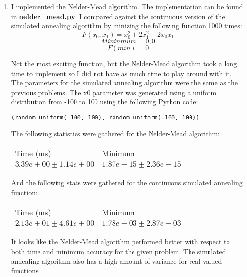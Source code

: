 \documentclass[11pt]{article}
\begin{document}
\begin{enumerate}
\begin{enumerate}
	{\bf Analysis}: The 10-node graph coloring problem was solved correctly every time given a random input list. The average runtime of 271 milliseconds seemed reasonable.

\end{enumerate}	
\item I implemented the Nelder-Mead algorithm. The implementation can be found in { \bf nelder\_mead.py}. I compared against the continuous version of the simulated annealing algorithm by minizing the following function 1000 times:
$$ F(x_0, x_1) =  x_0^2 + 2x_1^2 + 2x_0x_1 $$
$$ Mininmum = 0, 0 $$
$$ F(min) = 0 $$

Not the most exciting function, but the Nelder-Mead algorithm took a long time to implement so I did not have as much time to play around with it. The parameters for the simulated annealing algorithm were the same as the previous problems. The x0 parameter was generated using a uniform distribution from -100 to 100 using the following Python code:
\begin{lstlisting}
(random.uniform(-100, 100), random.uniform(-100, 100))
\end{lstlisting}

The following statistics were gathered for the Nelder-Mead algorithm:




	\begin{tabular}{ll}
		Time (ms)         & Minimum           \\
		$3.39e+00\pm1.14e+00$ & $1.87e-15\pm2.36e-15$
	\end{tabular}

And the following stats were gathered for the continuous simulated annealing function:

	\begin{tabular}{ll}
		Time (ms)         & Minimum           \\
		$2.13e+01\pm4.61e+00$ & $1.78e-03\pm2.87e-03$
	\end{tabular}

It looks like the Nelder-Mead algorithm performed better with respect to both time and minimum accuracy for the given problem. The simulated annealing algorithm also has a high amount of variance for real valued functions.


\end{enumerate}
\end{document}
